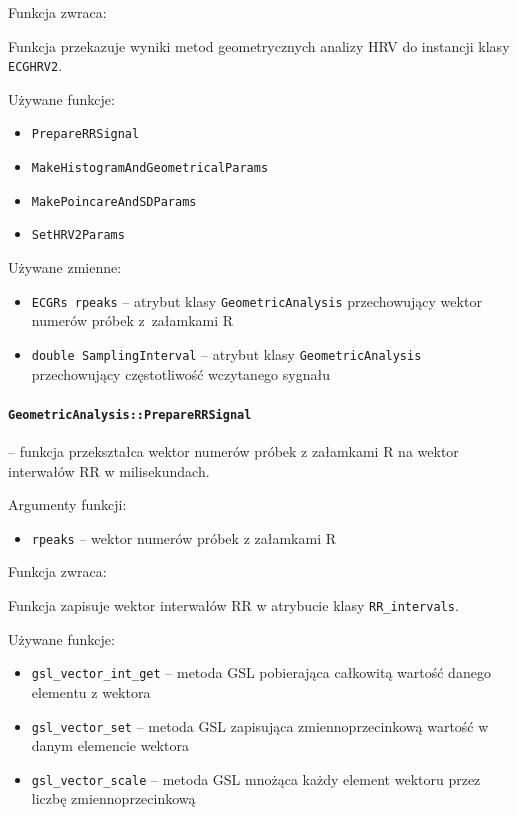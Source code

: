 \documentclass[a4paper, 11pt]{article}
\begin{document}
Funkcja zwraca:

Funkcja przekazuje wyniki metod geometrycznych analizy HRV do instancji
klasy \verb+ECGHRV2+.

\medskip{}


Używane funkcje:
\begin{itemize}
\item \verb+PrepareRRSignal+
\item \verb+MakeHistogramAndGeometricalParams+
\item \verb+MakePoincareAndSDParams+
\item \verb+SetHRV2Params+\medskip{}

\end{itemize}
Używane zmienne:
\begin{itemize}
\item \verb+ECGRs rpeaks+ -- atrybut klasy \verb+GeometricAnalysis+ przechowujący wektor
numerów próbek z~załamkami R
\item \verb+double SamplingInterval+ -- atrybut klasy \verb+GeometricAnalysis+ przechowujący
częstotliwość wczytanego sygnału
\end{itemize}


\medskip{}

\paragraph{\texttt{GeometricAnalysis::PrepareRRSignal}} -- funkcja przekształca wektor numerów próbek z załamkami R na wektor
interwałów RR w milisekundach.

\medskip{}


Argumenty funkcji:
\begin{itemize}
\item \verb+rpeaks+ -- wektor numerów próbek z załamkami R
\end{itemize}
\medskip{}


Funkcja zwraca:

Funkcja zapisuje wektor interwałów RR w atrybucie klasy \verb+RR_intervals+.

\medskip{}


Używane funkcje:
\begin{itemize}
\item \verb+gsl_vector_int_get+ -- metoda GSL pobierająca całkowitą wartość danego
elementu z wektora
\item \verb+gsl_vector_set+ -- metoda GSL zapisująca zmiennoprzecinkową wartość
w danym elemencie wektora
\item \verb+gsl_vector_scale+ -- metoda GSL mnożąca każdy element wektoru przez
liczbę zmiennoprzecinkową
\end{itemize}
\medskip{}
\end{document}
